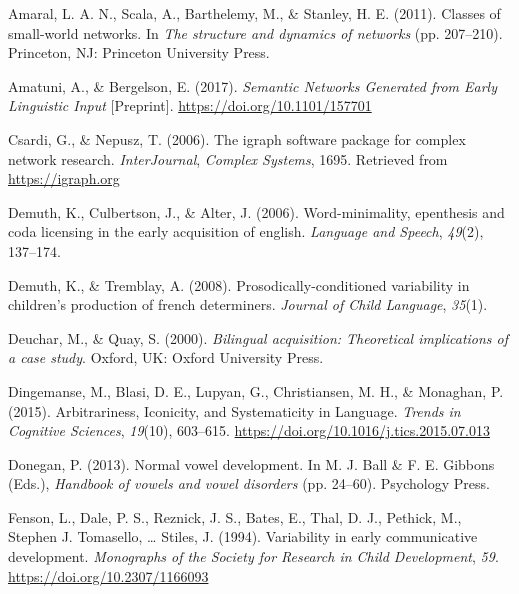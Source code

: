 \documentclass[
  man]{apa6}
\newlength{\cslhangindent}
\newenvironment{CSLReferences}[2] %
 {\begin{list}{}{%
  \setlength{\itemindent}{0pt}
  \setlength{\leftmargin}{0pt}
  \setlength{\parsep}{0pt}
  \ifodd #1
   \setlength{\leftmargin}{\cslhangindent}
   \setlength{\itemindent}{-1\cslhangindent}
  \fi
  \setlength{\itemsep}{#2\baselineskip}}}
 {\end{list}}
\begin{document}
\label{refs}
\begin{CSLReferences}{1}{0}
Amaral, L. A. N., Scala, A., Barthelemy, M., \& Stanley, H. E. (2011). Classes of small-world networks. In \emph{The structure and dynamics of networks} (pp. 207--210). Princeton, {NJ}: Princeton University Press.

Amatuni, A., \& Bergelson, E. (2017). \emph{Semantic {Networks} {Generated} from {Early} {Linguistic} {Input}} {[}Preprint{]}. \url{https://doi.org/10.1101/157701}

Csardi, G., \& Nepusz, T. (2006). The igraph software package for complex network research. \emph{InterJournal}, \emph{Complex Systems}, 1695. Retrieved from \url{https://igraph.org}

Demuth, K., Culbertson, J., \& Alter, J. (2006). Word-minimality, epenthesis and coda licensing in the early acquisition of english. \emph{Language and Speech}, \emph{49}(2), 137--174.

Demuth, K., \& Tremblay, A. (2008). Prosodically-conditioned variability in children's production of french determiners. \emph{Journal of Child Language}, \emph{35}(1).

Deuchar, M., \& Quay, S. (2000). \emph{Bilingual acquisition: Theoretical implications of a case study}. Oxford, {UK}: Oxford University Press.

Dingemanse, M., Blasi, D. E., Lupyan, G., Christiansen, M. H., \& Monaghan, P. (2015). Arbitrariness, {Iconicity}, and {Systematicity} in {Language}. \emph{Trends in Cognitive Sciences}, \emph{19}(10), 603--615. \url{https://doi.org/10.1016/j.tics.2015.07.013}

Donegan, P. (2013). Normal vowel development. In M. J. Ball \& F. E. Gibbons (Eds.), \emph{Handbook of vowels and vowel disorders} (pp. 24--60). Psychology Press.

Fenson, L., Dale, P. S., Reznick, J. S., Bates, E., Thal, D. J., Pethick, M., Stephen J. Tomasello, \ldots{} Stiles, J. (1994). Variability in early communicative development. \emph{Monographs of the Society for Research in Child Development}, \emph{59}. \url{https://doi.org/10.2307/1166093}


\end{CSLReferences}
\end{document}
